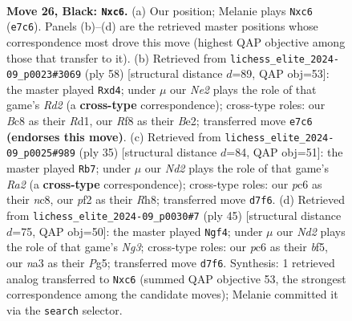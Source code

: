 \documentclass[11pt]{article}
\begin{document}
\clearpage

\begin{figure}[p]\centering
\begin{subfigure}{0.46\textwidth}\centering
\resizebox{\linewidth}{!}{%
\newchessgame
\chessboard[
  setfen={1rb2r2/p2nnp1k/1pP1p1pp/8/1RP5/N1B1PB1P/P4PP1/4RK2 b - - 0 26},
  showmover=false,
  pgfstyle=straightmove, color=movearrow, markmove={e7-c6}
]}
\caption{}
\end{subfigure}\hfill
\begin{subfigure}{0.46\textwidth}\centering
\resizebox{\linewidth}{!}{%
\newchessgame
\chessboard[
  setfen={2rr4/pp2bnk1/5pp1/5b1p/2Pp3P/P1N2PP1/1P1RBNK1/3R4 w - - 0 30},
  showmover=false,
  pgfstyle=straightmove, color=movearrow, markmove={d2-d4}
]}
\caption{}
\end{subfigure}
\\[4pt]
\begin{subfigure}{0.46\textwidth}\centering
\resizebox{\linewidth}{!}{%
\newchessgame
\chessboard[
  setfen={2N1k2r/r3bpp1/p1n1pn1p/1p1p4/8/P1P2BB1/1P3PPP/3RR1K1 b k - 3 18},
  showmover=false,
  pgfstyle=straightmove, color=movearrow, markmove={a7-b7}
]}
\caption{}
\end{subfigure}\hfill
\begin{subfigure}{0.46\textwidth}\centering
\resizebox{\linewidth}{!}{%
\newchessgame
\chessboard[
  setfen={1k1r3r/p1p5/1p2n1n1/4PBpp/8/P1P3BP/2P2PP1/1R3RK1 b - - 0 23},
  showmover=false,
  pgfstyle=straightmove, color=movearrow, markmove={g6-f4}
]}
\caption{}
\end{subfigure}
\caption{\textbf{Move 26, Black: \texttt{Nxc6}.} (a) Our position; Melanie plays \texttt{Nxc6} (\texttt{e7c6}). Panels (b)--(d) are the retrieved master positions whose correspondence most drove this move (highest QAP objective among those that transfer to it). (b) Retrieved from \texttt{lichess\_elite\_2024-09\_p0023\#3069} (ply 58) [structural distance $d$=89, QAP obj=53]: the master played \texttt{Rxd4}; under $\mu$ our \emph{Ne2} plays the role of that game's \emph{Rd2} (a \textbf{cross-type} correspondence); cross-type roles: our \emph{B}c8 as their \emph{R}d1, our \emph{R}f8 as their \emph{B}e2; transferred move \texttt{e7c6} \textbf{(endorses this move)}. (c) Retrieved from \texttt{lichess\_elite\_2024-09\_p0025\#989} (ply 35) [structural distance $d$=84, QAP obj=51]: the master played \texttt{Rb7}; under $\mu$ our \emph{Nd2} plays the role of that game's \emph{Ra2} (a \textbf{cross-type} correspondence); cross-type roles: our \emph{p}c6 as their \emph{n}c8, our \emph{p}f2 as their \emph{R}h8; transferred move \texttt{d7f6}. (d) Retrieved from \texttt{lichess\_elite\_2024-09\_p0030\#7} (ply 45) [structural distance $d$=75, QAP obj=50]: the master played \texttt{Ngf4}; under $\mu$ our \emph{Nd2} plays the role of that game's \emph{Ng3}; cross-type roles: our \emph{p}c6 as their \emph{b}f5, our \emph{n}a3 as their \emph{P}g5; transferred move \texttt{d7f6}. Synthesis: 1 retrieved analog transferred to \texttt{Nxc6} (summed QAP objective 53, the strongest correspondence among the candidate moves); Melanie committed it via the \texttt{search} selector.}
\label{fig:thought-m51}
\end{figure}
\end{document}
